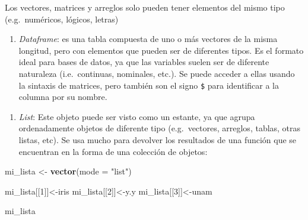 \documentclass[
]{article}
\newenvironment{Shaded}{\begin{snugshade}}{\end{snugshade}}
\newcommand{\CommentTok}[1]{\textcolor[rgb]{0.56,0.35,0.01}{\textit{#1}}}
\newcommand{\DataTypeTok}[1]{\textcolor[rgb]{0.13,0.29,0.53}{#1}}
\newcommand{\DecValTok}[1]{\textcolor[rgb]{0.00,0.00,0.81}{#1}}
\newcommand{\KeywordTok}[1]{\textcolor[rgb]{0.13,0.29,0.53}{\textbf{#1}}}
\newcommand{\NormalTok}[1]{#1}
\newcommand{\OperatorTok}[1]{\textcolor[rgb]{0.81,0.36,0.00}{\textbf{#1}}}
\newcommand{\StringTok}[1]{\textcolor[rgb]{0.31,0.60,0.02}{#1}}
\providecommand{\tightlist}{%
  \setlength{\itemsep}{0pt}\setlength{\parskip}{0pt}}
\begin{document}
Los vectores, matrices y arreglos solo pueden tener elementos del mismo
tipo (e.g.~numéricos, lógicos, letras)

\begin{enumerate}
\def\labelenumi{\Alph{enumi})}
\setcounter{enumi}{3}
\tightlist
\item
  \emph{Dataframe}: es una tabla compuesta de uno o más vectores de la
  misma longitud, pero con elementos que pueden ser de diferentes tipos.
  Es el formato ideal para bases de datos, ya que las variables suelen
  ser de diferente naturaleza (i.e.~continuas, nominales, etc.). Se
  puede acceder a ellas usando la sintaxis de matrices, pero también son
  el signo \texttt{\$} para identificar a la columna por su nombre.
\end{enumerate}

\begin{Shaded}
\end{Shaded}

\begin{enumerate}
\def\labelenumi{\Alph{enumi})}
\setcounter{enumi}{4}
\tightlist
\item
  \emph{List}: Este objeto puede ser visto como un estante, ya que
  agrupa ordenadamente objetos de diferente tipo (e.g.~vectores,
  arreglos, tablas, otras listas, etc). Se usa mucho para devolver los
  resultados de una función que se encuentran en la forma de una
  colección de objetos:
\end{enumerate}

\begin{Shaded}
\begin{Highlighting}[]
\NormalTok{mi_lista <-}\StringTok{ }\KeywordTok{vector}\NormalTok{(}\DataTypeTok{mode =} \StringTok{"list"}\NormalTok{)}

\NormalTok{mi_lista[[}\DecValTok{1}\NormalTok{]]<-iris}
\NormalTok{mi_lista[[}\DecValTok{2}\NormalTok{]]<-y.y}
\NormalTok{mi_lista[[}\DecValTok{3}\NormalTok{]]<-unam}

\NormalTok{mi_lista}
\end{Highlighting}
\end{Shaded}
\end{document}
